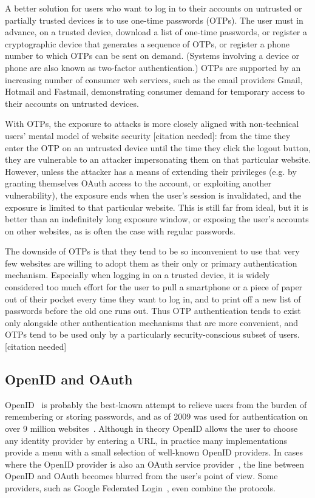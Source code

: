 A better solution for users who want to log in to their accounts on untrusted or partially trusted
devices is to use one-time passwords (OTPs). The user must in advance, on a trusted device, download
a list of one-time passwords, or register a cryptographic device that generates a sequence of OTPs,
or register a phone number to which OTPs can be sent on demand. (Systems involving a device or phone
are also known as two-factor authentication.) OTPs are supported by an increasing number of consumer
web services, such as the email providers Gmail, Hotmail and Fastmail, demonstrating consumer demand
for temporary access to their accounts on untrusted devices.

With OTPs, the exposure to attacks is more closely aligned with non-technical users' mental model of
website security [citation needed]: from the time they enter the OTP on an untrusted device until
the time they click the logout button, they are vulnerable to an attacker impersonating them on that
particular website. However, unless the attacker has a means of extending their privileges (e.g. by
granting themselves OAuth access to the account, or exploiting another vulnerability), the exposure
ends when the user's session is invalidated, and the exposure is limited to that particular website.
This is still far from ideal, but it is better than an indefinitely long exposure window, or
exposing the user's accounts on other websites, as is often the case with regular passwords.

The downside of OTPs is that they tend to be so inconvenient to use that very few websites are
willing to adopt them as their only or primary authentication mechanism. Especially when logging in
on a trusted device, it is widely considered too much effort for the user to pull a smartphone or a
piece of paper out of their pocket every time they want to log in, and to print off a new list of
passwords before the old one runs out. Thus OTP authentication tends to exist only alongside other
authentication mechanisms that are more convenient, and OTPs tend to be used only by a particularly
security-conscious subset of users. [citation needed]

\subsection{OpenID and OAuth}

OpenID~\cite{OpenID} is probably the best-known attempt to relieve users from the burden of
remembering or storing passwords, and as of 2009 was used for authentication on over 9 million
websites~\cite{OpenID09}.  Although in theory OpenID allows the user to choose any identity provider
by entering a URL, in practice many implementations provide a menu with a small selection of
well-known OpenID providers. In cases where the OpenID provider is also an OAuth service
provider~\cite{OAuth}, the line between OpenID and OAuth becomes blurred from the user's point of
view. Some providers, such as Google Federated Login~\cite{GoogleOpenID}, even combine the
protocols.

